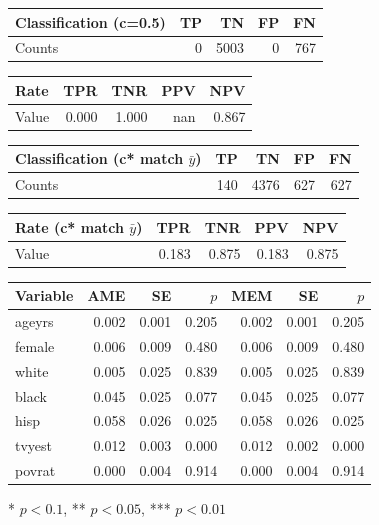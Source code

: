 \vspace{4pt}
\begin{table}[H]
\centering
\begin{tabular}{lrrrr}
\toprule
Classification (c=0.5) & TP & TN & FP & FN \\
\midrule
Counts & 0 & 5003 & 0 & 767 \\
\bottomrule
\end{tabular}
\end{table}
\begin{table}[H]
\centering
\begin{tabular}{lrrrr}
\toprule
Rate & TPR & TNR & PPV & NPV \\
\midrule
Value & 0.000 & 1.000 & nan & 0.867 \\
\bottomrule
\end{tabular}
\end{table}
\begin{table}[H]
\centering
\begin{tabular}{lrrrr}
\toprule
Classification (c* match $\bar{y}$) & TP & TN & FP & FN \\
\midrule
Counts & 140 & 4376 & 627 & 627 \\
\bottomrule
\end{tabular}
\end{table}
\begin{table}[H]
\centering
\begin{tabular}{lrrrr}
\toprule
Rate (c* match $\bar{y}$) & TPR & TNR & PPV & NPV \\
\midrule
Value & 0.183 & 0.875 & 0.183 & 0.875 \\
\bottomrule
\end{tabular}
\end{table}
\begin{table}[H]
\centering
\begin{tabular}{lrrrrrr}
\toprule
Variable & AME & SE & $p$ & MEM & SE & $p$ \\
\midrule
ageyrs & 0.002 & 0.001 & 0.205 & 0.002 & 0.001 & 0.205 \\
female & 0.006 & 0.009 & 0.480 & 0.006 & 0.009 & 0.480 \\
white & 0.005 & 0.025 & 0.839 & 0.005 & 0.025 & 0.839 \\
black & 0.045 & 0.025 & 0.077 & 0.045 & 0.025 & 0.077 \\
hisp & 0.058 & 0.026 & 0.025 & 0.058 & 0.026 & 0.025 \\
tvyest & 0.012 & 0.003 & 0.000 & 0.012 & 0.002 & 0.000 \\
povrat & 0.000 & 0.004 & 0.914 & 0.000 & 0.004 & 0.914 \\
\bottomrule
\end{tabular}
\end{table}
\vspace{2pt}
\begin{flushleft}\footnotesize{* $p<0.1$, ** $p<0.05$, *** $p<0.01$}\end{flushleft}